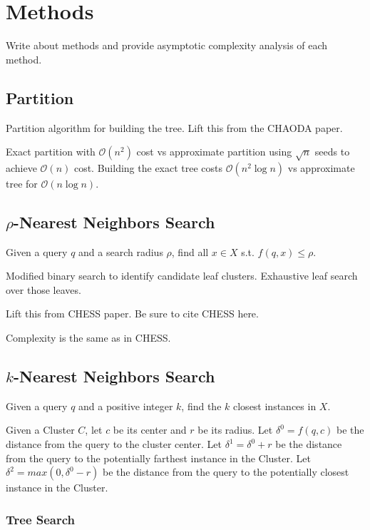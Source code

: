 \section{Methods}
\label{sec:methods}

Write about methods and provide asymptotic complexity analysis of each method.

\subsection{Partition}
\label{subsec:methods:partition}

Partition algorithm for building the tree.
Lift this from the CHAODA paper.

Exact partition with $\mathcal{O}(n^2)$ cost vs approximate partition using $\sqrt{n}$ seeds to achieve $\mathcal{O}(n)$ cost.
Building the exact tree costs $\mathcal{O}(n^2 \log n)$ vs approximate tree for $\mathcal{O}(n \log n)$.

\subsection{\texorpdfstring{$\rho$}{p}-Nearest Neighbors Search}
\label{subsec:methods:rnn-search}

Given a query $q$ and a search radius $\rho$, find all $x \in X$ s.t. $f(q, x) \leq \rho$.

Modified binary search to identify candidate leaf clusters.
Exhaustive leaf search over those leaves.

Lift this from CHESS paper. Be sure to cite CHESS here.

Complexity is the same as in CHESS.

\subsection{\texorpdfstring{$k$}{k}-Nearest Neighbors Search}
\label{subsec:methods:knn-search}

Given a query $q$ and a positive integer $k$, find the $k$ closest instances in $X$.

Given a Cluster $C$, let $c$ be its center and $r$ be its radius.
Let $\delta^0 = f(q, c)$ be the distance from the query to the cluster center.
Let $\delta^1 = \delta^0 + r$ be the distance from the query to the potentially farthest instance in the Cluster.
Let $\delta^2 = max(0, \delta^0 - r)$ be the distance from the query to the potentially closest instance in the Cluster.

\subsubsection{Tree Search}
\label{subsubsec:methods:knn-search:tree-search}

